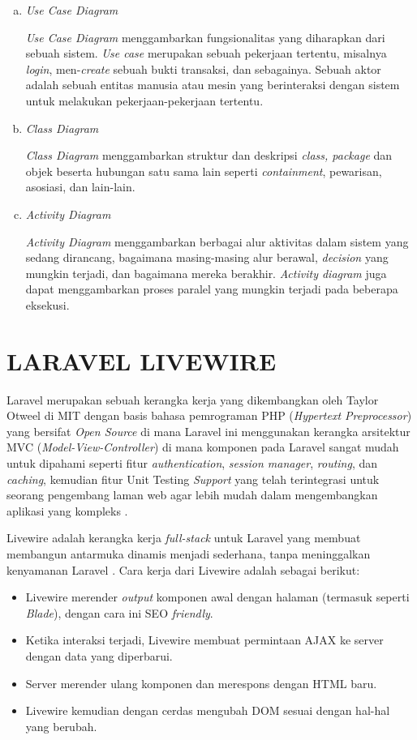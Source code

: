 \begin{enumerate}[a.]
	\item \textit{Use Case Diagram}
	\par \textit{Use Case Diagram} menggambarkan fungsionalitas yang diharapkan dari sebuah sistem. \textit{Use case} merupakan sebuah pekerjaan tertentu, misalnya \textit{login}, men-\textit{create} sebuah bukti transaksi, dan sebagainya. Sebuah aktor adalah sebuah entitas manusia atau mesin yang berinteraksi dengan sistem untuk melakukan pekerjaan-pekerjaan tertentu.
	\item \textit{Class Diagram}
	\par \textit{Class Diagram} menggambarkan struktur dan deskripsi \textit{class, package} dan objek beserta hubungan satu sama lain seperti \textit{containment}, pewarisan, asosiasi, dan lain-lain.
	\item \textit{Activity Diagram}
	\par \textit{Activity Diagram} menggambarkan berbagai alur aktivitas dalam sistem yang sedang dirancang, bagaimana masing-masing alur berawal, \textit{decision} yang mungkin terjadi, dan bagaimana mereka berakhir. \textit{Activity diagram} juga dapat menggambarkan proses paralel yang mungkin terjadi pada beberapa eksekusi.
\end{enumerate}

\section{\uppercase{Laravel Livewire}}
Laravel merupakan sebuah kerangka kerja yang dikembangkan oleh Taylor Otweel di MIT dengan basis bahasa pemrograman PHP (\textit{Hypertext Preprocessor}) yang bersifat \textit{Open Source} di mana Laravel ini menggunakan kerangka arsitektur MVC (\textit{Model-View-Controller}) di mana komponen pada Laravel sangat mudah untuk dipahami seperti fitur \textit{authentication}, \textit{session manager}, \textit{routing}, dan \textit{caching}, kemudian fitur Unit Testing \textit{Support} yang telah terintegrasi untuk seorang pengembang laman web agar lebih mudah dalam mengembangkan aplikasi yang kompleks \citep{sebastian2021perancanagan}.

\par Livewire adalah kerangka kerja \textit{full-stack} untuk Laravel yang membuat membangun antarmuka dinamis menjadi sederhana, tanpa meninggalkan kenyamanan Laravel \citep{livewire2021}. Cara kerja dari Livewire adalah sebagai berikut:

\begin{itemize}
	\item Livewire merender \textit{output} komponen awal dengan halaman (termasuk seperti \textit{Blade}), dengan cara ini SEO \textit{friendly}.
	\item Ketika interaksi terjadi, Livewire membuat permintaan AJAX ke server dengan data yang diperbarui.
	\item Server merender ulang komponen dan merespons dengan HTML baru.
	\item Livewire kemudian dengan cerdas mengubah DOM sesuai dengan hal-hal yang berubah.
\end{itemize}

